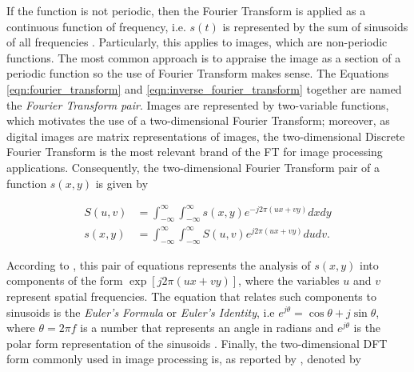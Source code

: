 \vspace{-1cm}

If the function is not periodic, then the Fourier Transform is applied as a continuous function of frequency, i.e. $s(t)$ is represented by the sum of sinusoids of all frequencies \cite{brigham1988fast}. Particularly, this applies to images, which are non-periodic functions. The most common approach is to appraise the image as a section of a periodic function so the use of Fourier Transform makes sense. The Equations \ref{eqn:fourier_transform} and \ref{eqn:inverse_fourier_transform} together are named the \emph{Fourier Transform pair}. Images are represented by two-variable functions, which motivates the use of a two-dimensional Fourier Transform; moreover, as digital images are matrix representations of images, the two-dimensional Discrete Fourier Transform is the most relevant brand of the FT for image processing applications. Consequently, the two-dimensional Fourier Transform pair of a function $s(x,y)$ is given by

\begin{align}
\label{eqn:two_dimensional_continuous_fourier_transform}
S(u,v) &= \int_{-\infty}^{\infty}
         \int_{-\infty}^{\infty}
         s(x,y) e^{-j 2 \pi 
                    \left(
                        ux + vy
                    \right)
                  }
        dx dy\\
s(x,y) &= \int_{-\infty}^{\infty}
         \int_{-\infty}^{\infty}
         S(u,v) e^{j 2 \pi 
                    \left(
                        ux + vy
                    \right)
                  }
        du dv.
\end{align}

According to , this pair of equations represents the analysis of $s(x,y)$ into components of the form $\exp{\left[j 2 \pi (ux + vy) \right]}$, where the variables $u$ and $v$ represent spatial frequencies. The equation that relates such components to sinusoids is the \emph{Euler's Formula} or \emph{Euler's Identity}, i.e $e^{j\theta} = \cos{\theta} + j\sin{\theta}$, where $\theta = 2 \pi f$ is a number that represents an angle in radians and $e^{j\theta}$ is the polar form representation of the sinusoids \cite{gonzalez2018digital}. Finally, the two-dimensional DFT form commonly used in image processing is, as reported by , denoted by


